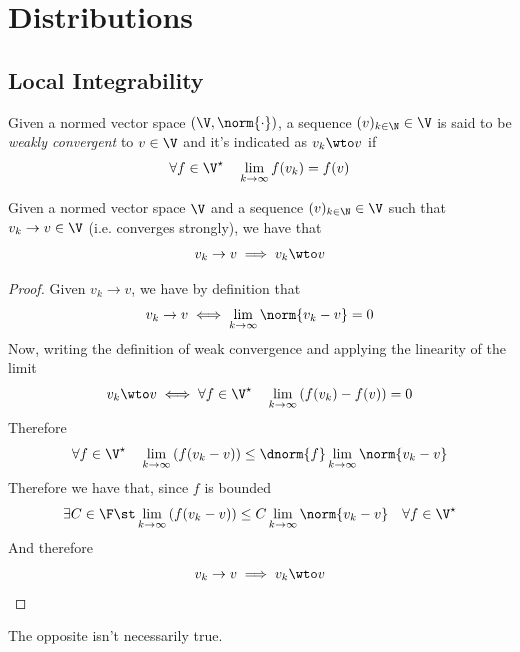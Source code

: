 \documentclass[../mmf.tex]{subfiles}
\begin{document}
\section{Distributions}
\subsection{Local Integrability}
\begin{dfn}
	Given a normed vector space $(\V,\norm{\cdot})$, a sequence $(v)_{k\in\N}\in\V$ is said to be \textit{weakly convergent} to $v\in\V$ and it's indicated as $v_k\wto v$ if
	\begin{equation*}
		\forall f\in\V^\star\quad\lim_{k\to\infty}f(v_k)=f(v)
	\end{equation*}
\end{dfn}
\begin{thm}
	Given a normed vector space $\V$ and a sequence $(v)_{k\in\N}\in\V$ such that $v_k\to v\in\V$ (i.e. converges strongly), we have that
	\begin{equation*}
		v_k\to v\implies{} v_k\wto v
	\end{equation*}
\end{thm}
\begin{proof}
	Given $v_k\to v$, we have by definition that
	\begin{equation*}
		v_k\to v\iff\lim_{k\to\infty}\norm{v_k-v}=0
	\end{equation*}
	Now, writing the definition of weak convergence and applying the linearity of the limit
	\begin{equation*}
		v_k\wto v\iff\forall f\in\V^\star\quad\lim_{k\to\infty}\left( f(v_k)-f(v) \right)=0
	\end{equation*}
	Therefore
	\begin{equation*}
		\forall f\in\V^\star\quad\lim_{k\to\infty}\left( f(v_k-v) \right)\le\dnorm{f}\lim_{k\to\infty}\norm{v_k-v}
	\end{equation*}
	Therefore we have that, since $f$ is bounded
	\begin{equation*}
		\exists C\in\F\st\lim_{k\to\infty}\left( f(v_k-v) \right)\le C\lim_{k\to\infty}\norm{v_k-v}\quad\forall f\in\V^\star
	\end{equation*}
	And therefore
	\begin{equation*}
		v_k\to v\implies{} v_k\wto v
	\end{equation*}
\end{proof}
\begin{rmk}
	The opposite isn't necessarily true.
\end{rmk}
\end{document}
